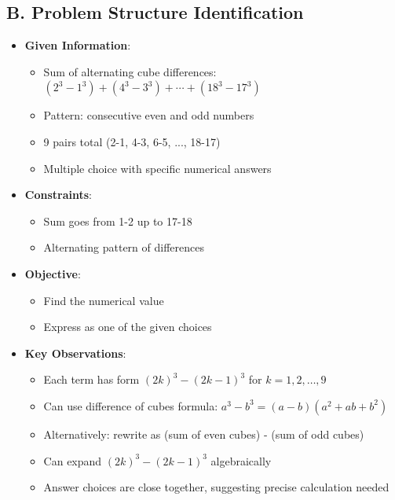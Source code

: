 \documentclass[12pt]{article}
\begin{document}
\begin{problemconfigbox}
\subsection*{B. Problem Structure Identification}
\begin{itemize}[leftmargin=*]
    \item \textbf{Given Information}: 
    \begin{itemize}
        \item Sum of alternating cube differences: $(2^3-1^3) + (4^3-3^3) + \cdots + (18^3-17^3)$
        \item Pattern: consecutive even and odd numbers
        \item 9 pairs total (2-1, 4-3, 6-5, ..., 18-17)
        \item Multiple choice with specific numerical answers
    \end{itemize}
    \item \textbf{Constraints}: 
    \begin{itemize}
        \item Sum goes from 1-2 up to 17-18
        \item Alternating pattern of differences
    \end{itemize}
    \item \textbf{Objective}: 
    \begin{itemize}
        \item Find the numerical value
        \item Express as one of the given choices
    \end{itemize}
    \item \textbf{Key Observations}: 
    \begin{itemize}
        \item Each term has form $(2k)^3 - (2k-1)^3$ for $k = 1, 2, \ldots, 9$
        \item Can use difference of cubes formula: $a^3 - b^3 = (a-b)(a^2+ab+b^2)$
        \item Alternatively: rewrite as (sum of even cubes) - (sum of odd cubes)
        \item Can expand $(2k)^3 - (2k-1)^3$ algebraically
        \item Answer choices are close together, suggesting precise calculation needed
    \end{itemize}
\end{itemize}


\end{problemconfigbox}
\end{document}
